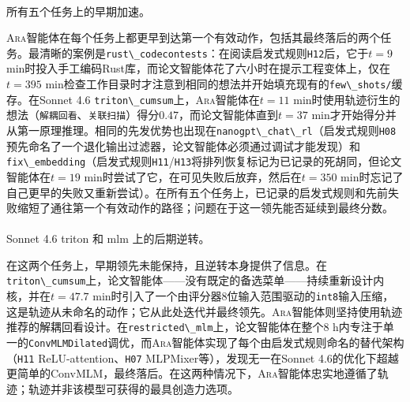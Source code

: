 \documentclass[
]{article}
\makeatletter
\let\oldparagraph\paragraph
\renewcommand{\paragraph}{
    \@ifstar
      \xxxParagraphStar
      \xxxParagraphNoStar
  }
\newcommand{\xxxParagraphStar}[1]{\oldparagraph*{#1}\mbox{}}
\newcommand{\xxxParagraphNoStar}[1]{\oldparagraph{#1}\mbox{}}
\newcommand{\passthrough}[1]{#1}
\theoremstyle{definition}
\newcommand{\ara}{\textsc{Ara}}
\makeatother
\begin{document}
\paragraph{所有五个任务上的早期加速。}\label{ux6240ux6709ux4e94ux4e2aux4efbux52a1ux4e0aux7684ux65e9ux671fux52a0ux901f}

\ara{}智能体在每个任务上都更早到达第一个有效动作，包括其最终落后的两个任务。最清晰的案例是\passthrough{\lstinline!rust\_codecontests!}：在阅读启发式规则\passthrough{\lstinline!H12!}后，它于\(t = 9\)
min时投入手工编码Rust库，而论文智能体花了六小时在提示工程变体上，仅在\(t = 395\)
min检查工作目录时才注意到相同的想法并开始填充现有的\passthrough{\lstinline!few\_shots/!}缓存。在Sonnet
4.6 \passthrough{\lstinline!triton\_cumsum!}上，\ara{}智能体在\(t = 11\)
min时使用轨迹衍生的想法（\passthrough{\lstinline!解耦回看!}、\passthrough{\lstinline!关联扫描!}）得分\(0.47\)，而论文智能体直到\(t = 37\)
min才开始得分并从第一原理推理。相同的先发优势也出现在\passthrough{\lstinline!nanogpt\_chat\_rl!}（启发式规则\passthrough{\lstinline!H08!}预先命名了一个退化输出过滤器，论文智能体必须通过调试才能发现）和\passthrough{\lstinline!fix\_embedding!}（启发式规则\passthrough{\lstinline!H11!}/\passthrough{\lstinline!H13!}将排列恢复标记为已记录的死胡同，但论文智能体在\(t = 19\)
min时尝试了它，在可见失败后放弃，然后在\(t = 350\)
min时忘记了自己更早的失败又重新尝试）。在所有五个任务上，已记录的启发式规则和先前失败缩短了通往第一个有效动作的路径；问题在于这一领先能否延续到最终分数。

\paragraph{Sonnet 4.6 triton 和 mlm
上的后期逆转。}\label{sonnet-4.6-triton-ux548c-mlm-ux4e0aux7684ux540eux671fux9006ux8f6c}

在这两个任务上，早期领先未能保持，且逆转本身提供了信息。在\passthrough{\lstinline!triton\_cumsum!}上，论文智能体------没有既定的备选菜单------持续重新设计内核，并在\(t = 47.7\)
min时引入了一个由评分器8位输入范围驱动的\passthrough{\lstinline!int8!}输入压缩，这是轨迹从未命名的动作；它从此处迭代并最终领先。\ara{}智能体则坚持使用轨迹推荐的解耦回看设计。在\passthrough{\lstinline!restricted\_mlm!}上，论文智能体在整个8
h内专注于单一的\passthrough{\lstinline!ConvMLMDilated!}调优，而\ara{}智能体实现了每个由启发式规则命名的替代架构（\passthrough{\lstinline!H11!}
ReLU-attention、\passthrough{\lstinline!H07!}
MLPMixer等），发现无一在Sonnet
4.6的优化下超越更简单的ConvMLM，最终落后。在这两种情况下，\ara{}智能体忠实地遵循了轨迹；轨迹并非该模型可获得的最具创造力选项。
\end{document}
